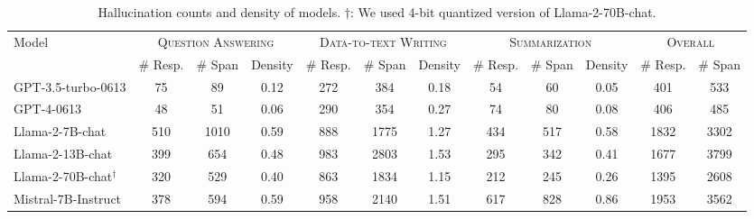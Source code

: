 \begin{table}[!ht]
\centering
\scriptsize
\begin{tabular}{l|ccccccccccc}
\toprule
\multirow{2}{*}{Model}  & \multicolumn{3}{c}{\textsc{Question Answering}} &\multicolumn{3}{c}{\textsc{Data-to-text Writing}} & \multicolumn{3}{c}{\textsc{Summarization}} &\multicolumn{2}{c}{\textsc{Overall}}\\
\cmidrule(lr){2-4} \cmidrule(lr){5-7} \cmidrule(lr){8-10}  \cmidrule(lr){11-12}
    & \# Resp. & \# Span & Density & \# Resp.  & \# Span & Density & \# Resp.  & \# Span & Density & \# Resp.  & \# Span\\
\midrule
GPT-3.5-turbo-0613    & 75 & 89 & 0.12 & 272 & 384 & 0.18 & 54 & 60 & 0.05 & 401  &   533    \\
GPT-4-0613   & 48 &  51 & 0.06 & 290 & 354 &  0.27 &  74 &  80 & 0.08 & 406  & 485    \\
Llama-2-7B-chat  & 510 & 1010 & 0.59 & 888 & 1775 & 1.27 & 434 & 517 & 0.58 & 1832 &  3302   \\
Llama-2-13B-chat    & 399 & 654 & 0.48  & 983 & 2803 & 1.53 & 295 & 342 & 0.41 & 1677 &  3799   \\
Llama-2-70B-chat$^{\dagger}$  & 320 & 529 & 0.40 & 863 & 1834 & 1.15 & 212 & 245 & 0.26  & 1395 & 2608    \\
Mistral-7B-Instruct  & 378 & 594 & 0.59 & 958 & 2140 & 1.51 & 617 & 828 & 0.86 & 1953 & 3562   \\
\bottomrule
\end{tabular}
\caption{Hallucination counts and density of models. 
$\dagger$: We used 4-bit quantized version of Llama-2-70B-chat.}
\label{tab:halu-model}
\end{table}